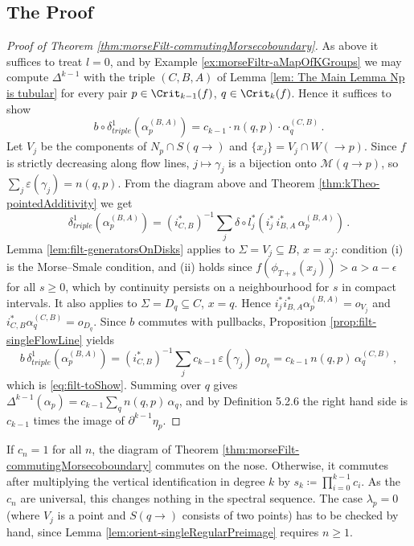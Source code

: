 \subsection{The Proof}

\begin{proof}[Proof of Theorem \ref{thm:morseFilt-commutingMorsecoboundary}]
	As above it suffices to treat $l=0$, and by Example \ref{ex:morseFiltr-aMapOfKGroups} we may compute $\Delta^{k-1}$ with the triple $(C,B,A)$ of Lemma \ref{lem: The Main Lemma Np is tubular} for every pair $p\in\Crit_{k-1}(f)$, $q\in\Crit_k(f)$. Hence it suffices to show
	\begin{equation}\label{eq:filt-toShow}
		b\circ\delta^1_{triple}\left(\alpha_p^{(B,A)}\right)=c_{k-1}\cdot n(q,p)\cdot\alpha_q^{(C,B)}\,.
	\end{equation}
	Let $V_j$ be the components of $N_p\cap S(q\to)$ and $\{x_j\}=V_j\cap W(\to p)$. Since $f$ is strictly decreasing along flow lines, $j\mapsto\gamma_j$ is a bijection onto $\mathcal{M}(q\to p)$, so $\sum_j\varepsilon(\gamma_j)=n(q,p)$. From the diagram above and Theorem \ref{thm:kTheo-pointedAdditivity} we get
	\begin{equation*}
		\delta^1_{triple}\left(\alpha_p^{(B,A)}\right)=\left(i_{C,B}^*\right)^{-1}\sum_j\delta\circ l_j^*\left(i_j^*\,i_{B,A}^*\,\alpha_p^{(B,A)}\right)\,.
	\end{equation*}
	Lemma \ref{lem:filt-generatorsOnDisks} applies to $\Sigma=V_j\subseteq B$, $x=x_j$: condition (i) is the Morse--Smale condition, and (ii) holds since $f(\phi_{T+s}(x_j))>a>a-\epsilon$ for all $s\geq0$, which by continuity persists on a neighbourhood for $s$ in compact intervals. It also applies to $\Sigma=D_q\subseteq C$, $x=q$. Hence $i_j^*i_{B,A}^*\alpha_p^{(B,A)}=o_{V_j}$ and $i_{C,B}^*\alpha_q^{(C,B)}=o_{D_q}$. Since $b$ commutes with pullbacks, Proposition \ref{prop:filt-singleFlowLine} yields
	\begin{equation*}
		b\,\delta^1_{triple}\left(\alpha_p^{(B,A)}\right)
		=\left(i_{C,B}^*\right)^{-1}\sum_j c_{k-1}\,\varepsilon(\gamma_j)\,o_{D_q}
		=c_{k-1}\,n(q,p)\,\alpha_q^{(C,B)}\,,
	\end{equation*}
	which is \eqref{eq:filt-toShow}. Summing over $q$ gives $\Delta^{k-1}(\alpha_p)=c_{k-1}\sum_q n(q,p)\,\alpha_q$, and by Definition 5.2.6 the right hand side is $c_{k-1}$ times the image of $\partial^{k-1}\eta_p$.
\end{proof}

\begin{remark}
	If $c_n=1$ for all $n$, the diagram of Theorem \ref{thm:morseFilt-commutingMorsecoboundary} commutes on the nose. Otherwise, it commutes after multiplying the vertical identification in degree $k$ by $s_k\coloneq\prod_{i=0}^{k-1}c_i$. As the $c_n$ are universal, this changes nothing in the spectral sequence. The case $\lambda_p=0$ (where $V_j$ is a point and $S(q\to)$ consists of two points) has to be checked by hand, since Lemma \ref{lem:orient-singleRegularPreimage} requires $n\geq1$.
\end{remark}
